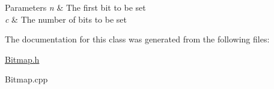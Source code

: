 \begin{DoxyParams}{\-Parameters}
{\em n} & \-The first bit to be set \\
\hline
{\em c} & \-The number of bits to be set \\
\hline
\end{DoxyParams}


\-The documentation for this class was generated from the following files\-:\begin{DoxyCompactItemize}
\item 
\hyperlink{Bitmap_8h}{\-Bitmap.\-h}\item 
\-Bitmap.\-cpp\end{DoxyCompactItemize}
